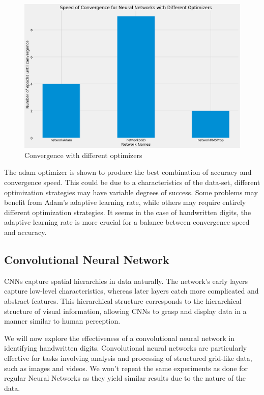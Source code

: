 \documentclass[a4paper,twoside,10pt]{article}
\begin{document}
\begin{figure}[H]
    \centering
    \includegraphics[scale=0.3]{Convergence Optimizers}
    \caption{Convergence with different optimizers}
    \label{fig:nn_optimizer_convergence}
\end{figure}

The adam optimizer is shown to produce the best combination of accuracy and convergence speed. This could be due to a characteristics of the data-set, different optimization strategies may have variable degrees of success. Some problems may benefit from Adam's adaptive learning rate, while others may require entirely different optimization strategies. It seems in the case of handwritten digits, the adaptive learning rate is more crucial for a balance between convergence speed and accuracy.  

\subsection{Convolutional Neural Network}
CNNs capture spatial hierarchies in data naturally. The network's early layers capture low-level characteristics, whereas later layers catch more complicated and abstract features. This hierarchical structure corresponds to the hierarchical structure of visual information, allowing CNNs to grasp and display data in a manner similar to human perception.

We will now explore the effectiveness of a convolutional neural network in identifying handwritten digits. Convolutional neural networks are particularly effective for tasks involving analysis and processing of structured grid-like data, such as images and videos. We won't repeat the same experiments as done for regular Neural Networks as they yield similar results due to the nature of the data. 
\end{document}
